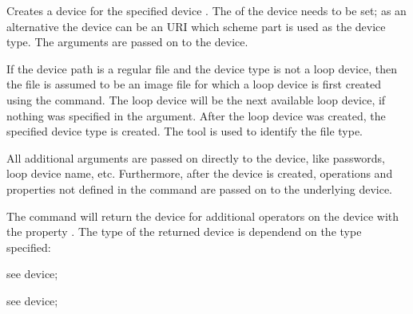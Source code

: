 %


Creates a device for the specified device . The 
of the device needs to be set; as an alternative the device 
can be an URI which scheme part is used as the device type.
The  arguments are passed on to the device.

If the device path is a regular file and the device type is not a loop device, 
then the file is assumed to be an image file for which a loop device is 
first created using the  command. The loop device will be the
next available loop device, if nothing was specified in the  argument.
After the loop device was created, the specified device type is created.
The \cite{mancxfile13} tool is used to identify the file type.

All additional arguments are passed on directly to the device, like passwords,
loop device name, etc. Furthermore, after the device is created, operations
and properties not defined in the command are passed on to the underlying device.

The command will return the device for additional operators on the device
with the property . The type of the returned device is 
dependend on the type specified:

\begin{asparaitem}
%
\item {} see  device;
\item {} see  device;
%
\end{asparaitem}


